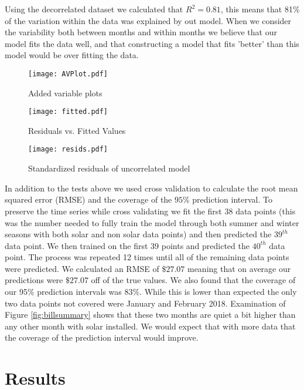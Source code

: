 \documentclass{svproc}
\begin{document}
Using the decorrelated dataset we calculated that ${R^2} = 0.81$, this means that 81$\%$ of the variation within the data was explained by out model. When we consider the variability both between months and within months we believe that our model fits the data well, and that constructing a model that fits 'better' than this model would be over fitting the data.    




\begin{figure}[htp] 
\begin{minipage}[t]{.45\linewidth}
\texttt{[image: AVPlot.pdf]}
\caption{Added variable plots}
\label{AV}
\end{minipage}\hfill
\begin{minipage}[t]{.45\linewidth}
\texttt{[image: fitted.pdf]}
\caption{Residuals vs. Fitted Values}
\label{fitted}
\end{minipage}
\end{figure}

\begin{figure}
\centering
\texttt{[image: resids.pdf]}
\caption{Standardized residuals of uncorrelated model}
\label{resids}
\end{figure}

In addition to the tests above we used cross validation to calculate the root mean squared error (RMSE) and the coverage of the $95\%$ prediction interval. To preserve the time series while cross validating we fit the first 38 data points (this was the number needed to fully train the model through both summer and winter seasons with both solar and non solar data points) and then predicted the $39^{th}$ data point. We then trained on the first 39 points and predicted the $40^{th}$ data point. The process was repeated 12 times until all of the remaining data points were predicted. We calculated an RMSE of $\$27.07$ meaning that on average our predictions were $\$27.07$ off of the true values. We also found that the coverage of our 95$\%$ prediction intervals was $83\%$. While this is lower than expected the only two data points not covered were January and February 2018. Examination of Figure \ref{fig:billsummary} shows that these two months are quiet a bit higher than any other month with solar installed. We would expect that with more data that the coverage of the prediction interval would improve. 

 
\section{Results}
\end{document}
